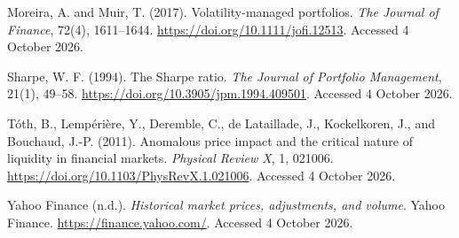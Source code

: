 Moreira, A. and Muir, T. (2017). Volatility-managed portfolios. \emph{The Journal of Finance}, 72(4), 1611--1644. \url{https://doi.org/10.1111/jofi.12513}. Accessed 4 October 2026.

Sharpe, W. F. (1994). The Sharpe ratio. \emph{The Journal of Portfolio Management}, 21(1), 49--58. \url{https://doi.org/10.3905/jpm.1994.409501}. Accessed 4 October 2026.

Tóth, B., Lempérière, Y., Deremble, C., de Lataillade, J., Kockelkoren, J., and Bouchaud, J.-P. (2011). Anomalous price impact and the critical nature of liquidity in financial markets. \emph{Physical Review X}, 1, 021006. \url{https://doi.org/10.1103/PhysRevX.1.021006}. Accessed 4 October 2026.

Yahoo Finance (n.d.). \emph{Historical market prices, adjustments, and volume}. Yahoo Finance. \url{https://finance.yahoo.com/}. Accessed 4 October 2026.
